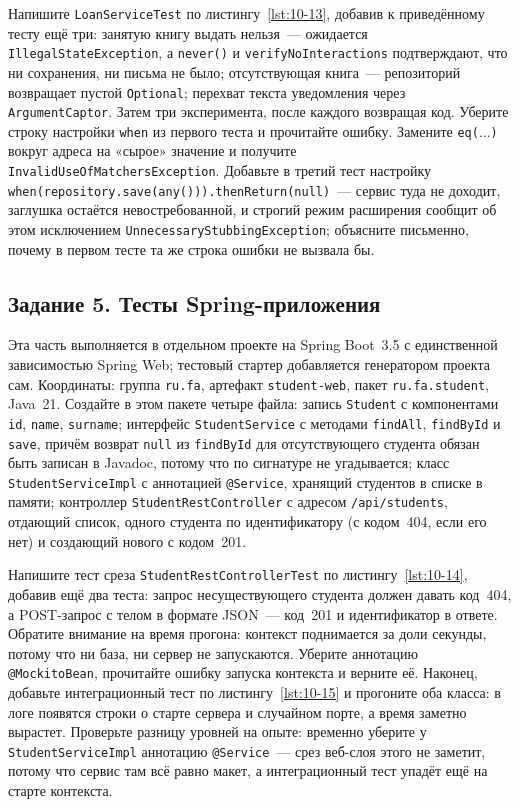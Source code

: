 Напишите \texttt{LoanServiceTest} по листингу~\ref{lst:10-13}, добавив к приведённому тесту ещё три: занятую книгу выдать нельзя~--- ожидается \texttt{IllegalStateException}, а \texttt{never()} и \texttt{verifyNoInteractions} подтверждают, что ни сохранения, ни письма не было; отсутствующая книга~--- репозиторий возвращает пустой \texttt{Optional}; перехват текста уведомления через \texttt{ArgumentCaptor}. Затем три эксперимента, после каждого возвращая код. Уберите строку настройки \texttt{when} из первого теста и прочитайте ошибку. Замените \texttt{eq($\ldots$)} вокруг адреса на «сырое» значение и получите \texttt{InvalidUseOfMatchersException}. Добавьте в третий тест настройку \texttt{when(repository.save(any())).thenReturn(null)}~--- сервис туда не доходит, заглушка остаётся невостребованной, и строгий режим расширения сообщит об этом исключением \texttt{UnnecessaryStubbingException}; объясните письменно, почему в первом тесте та же строка ошибки не вызвала бы.

\subsection*{Задание 5. Тесты Spring-приложения}

Эта часть выполняется в отдельном проекте на Spring Boot~3.5 с единственной зависимостью Spring Web; тестовый стартер добавляется генератором проекта сам. Координаты: группа \texttt{ru.fa}, артефакт \texttt{student-web}, пакет \texttt{ru.fa.student}, Java~21. Создайте в этом пакете четыре файла: запись \texttt{Student} с компонентами \texttt{id}, \texttt{name}, \texttt{surname}; интерфейс \texttt{StudentService} с методами \texttt{findAll}, \texttt{findById} и \texttt{save}, причём возврат \texttt{null} из \texttt{findById} для отсутствующего студента обязан быть записан в Javadoc, потому что по сигнатуре не угадывается; класс \texttt{StudentServiceImpl} с аннотацией \texttt{@Service}, хранящий студентов в списке в памяти; контроллер \texttt{StudentRestController} с адресом \texttt{/api/students}, отдающий список, одного студента по идентификатору (с кодом~404, если его нет) и создающий нового с кодом~201.

Напишите тест среза \texttt{StudentRestControllerTest} по листингу~\ref{lst:10-14}, добавив ещё два теста: запрос несуществующего студента должен давать код~404, а POST-запрос с телом в формате JSON~--- код~201 и идентификатор в ответе. Обратите внимание на время прогона: контекст поднимается за доли секунды, потому что ни база, ни сервер не запускаются. Уберите аннотацию \texttt{@MockitoBean}, прочитайте ошибку запуска контекста и верните её. Наконец, добавьте интеграционный тест по листингу~\ref{lst:10-15} и прогоните оба класса: в логе появятся строки о старте сервера и случайном порте, а время заметно вырастет. Проверьте разницу уровней на опыте: временно уберите у \texttt{StudentServiceImpl} аннотацию \texttt{@Service}~--- срез веб-слоя этого не заметит, потому что сервис там всё равно макет, а интеграционный тест упадёт ещё на старте контекста.

